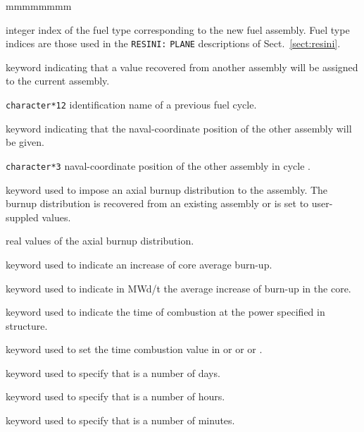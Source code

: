 \begin{ListeDeDescription}{mmmmmmmm}
\item[\dusa{fuel}] integer index of the fuel type corresponding to the new fuel assembly. Fuel type indices are those used in the
{\tt RESINI:} {\tt PLANE} descriptions of Sect.~\ref{sect:resini}.

\item[\moc{FROM}] keyword indicating that a value recovered from another assembly will be assigned to the current assembly.

\item[\dusa{hcold2}] \texttt{character*12} identification name of a previous fuel cycle.

\item[\moc{AT}] keyword indicating that the naval-coordinate position of the other assembly will be given.

\item[\dusa{asmb2}] \texttt{character*3} naval-coordinate position of the other assembly in cycle .

\item[\moc{DIST-AX}] keyword used to impose an axial burnup distribution to the assembly. The burnup distribution is recovered from an existing assembly or is set to
user-suppled values.

\item[\dusa{axn}] real values of the axial burnup distribution.

\item[\moc{BURN-STEP}] keyword used to indicate an increase of core average burn-up.

\item[\dusa{rburn}] keyword used to indicate in MWd/t the average increase
of burn-up in the core.

\item[\moc{TIME}] keyword used to indicate the time of combustion at the power specified
in  structure.

\item[\dusa{rtime}] keyword used to set the time combustion value in  or 
or  or .

\item[\moc{DAY}] keyword used to specify that  is a number of days.

\item[\moc{HOUR}] keyword used to specify that  is a number of hours.

\item[\moc{MINUTE}] keyword used to specify that  is a number of minutes.


\end{ListeDeDescription}
